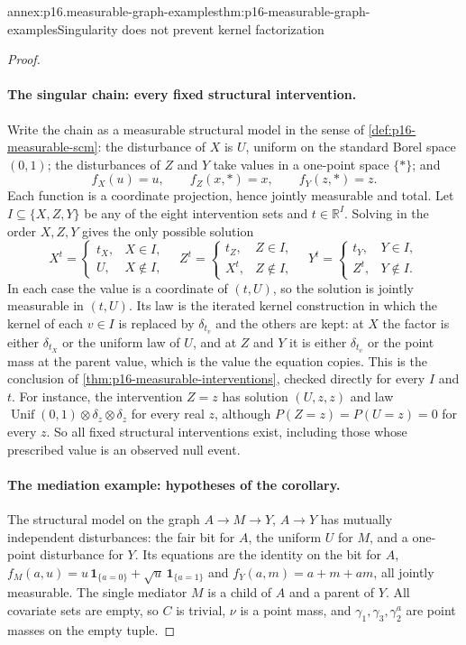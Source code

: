 \begin{annexitem}{annex:p16.measurable-graph-examples}{thm:p16-measurable-graph-examples}{Singularity does not prevent kernel factorization}
\begin{proof}
\paragraph{The singular chain: every fixed structural intervention.}
Write the chain as a measurable structural model in the sense of
\cref{def:p16-measurable-scm}: the disturbance of \(X\) is \(U\),
uniform on the standard Borel space \((0,1)\); the disturbances of
\(Z\) and \(Y\) take values in a one-point space \(\{\ast\}\); and
\[
 f_X(u)=u,\qquad f_Z(x,\ast)=x,\qquad f_Y(z,\ast)=z .
\]
Each function is a coordinate projection, hence jointly measurable and
total. Let \(I\subseteq\{X,Z,Y\}\) be any of the eight intervention
sets and \(t\in\mathbb R^I\). Solving in the order \(X,Z,Y\) gives
the only possible solution
\[
 X^t=\begin{cases}t_X,&X\in I,\\U,&X\notin I,\end{cases}\quad
 Z^t=\begin{cases}t_Z,&Z\in I,\\X^t,&Z\notin I,\end{cases}\quad
 Y^t=\begin{cases}t_Y,&Y\in I,\\Z^t,&Y\notin I.\end{cases}
\]
In each case the value is a coordinate of \((t,U)\), so the solution
is jointly measurable in \((t,U)\). Its law is the iterated kernel
construction in which the kernel of each \(v\in I\) is replaced by
\(\delta_{t_v}\) and the others are kept: at \(X\) the factor is
either \(\delta_{t_X}\) or the uniform law of \(U\), and at \(Z\) and
\(Y\) it is either \(\delta_{t_v}\) or the point mass at the parent
value, which is the value the equation copies. This is the conclusion
of \cref{thm:p16-measurable-interventions}, checked directly for every
\(I\) and \(t\). For instance, the intervention \(Z=z\) has solution
\((U,z,z)\) and law
\(\operatorname{Unif}(0,1)\otimes\delta_z\otimes\delta_z\) for every
real \(z\), although \(P(Z=z)=P(U=z)=0\) for every \(z\). So all fixed
structural interventions exist, including those whose prescribed value
is an observed null event.

\paragraph{The mediation example: hypotheses of the corollary.}
The structural model on the graph \(A\to M\to Y\), \(A\to Y\) has
mutually independent disturbances: the fair bit for \(A\), the uniform
\(U\) for \(M\), and a one-point disturbance for \(Y\). Its equations
are the identity on the bit for \(A\),
\(f_M(a,u)=u\,\mathbf1_{\{a=0\}}+\sqrt u\,\mathbf1_{\{a=1\}}\) and
\(f_Y(a,m)=a+m+am\), all jointly measurable. The single mediator
\(M\) is a child of \(A\) and a parent of \(Y\). All covariate sets
are empty, so \(C\) is trivial, \(\nu\) is a point mass, and
\(\gamma_1,\gamma_3,\gamma_2^a\) are point masses on the empty tuple.


\end{proof}
\end{annexitem}
